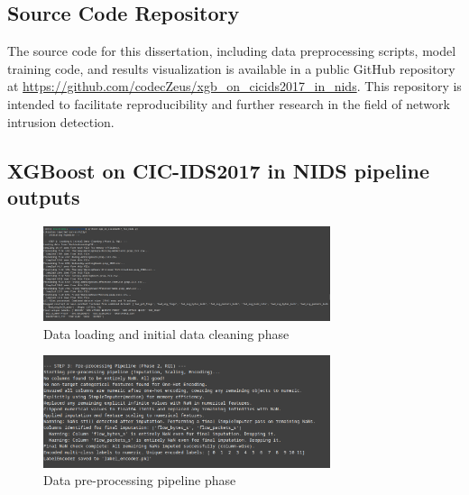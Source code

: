 \subsection{Source Code Repository}
The source code for this dissertation, including data preprocessing scripts, model training code, and results visualization
is available in a public GitHub repository at \url{https://github.com/codecZeus/xgb_on_cicids2017_in_nids}. This repository is intended to 
facilitate reproducibility and further research in the field of network intrusion detection.


\subsection*{XGBoost on CIC-IDS2017 in NIDS pipeline outputs}
\begin{figure}[H]
     \centering
     \includegraphics[width=0.75\textwidth]{assets/figures/outputs/1.png}
     \caption{Data loading and initial data cleaning phase}
     \label{fig:number_of_samples_per_category_initial_dataset} 
 \end{figure}

 \begin{figure}[H]
     \centering
     \includegraphics[width=0.75\textwidth]{assets/figures/outputs/2.png}
     \caption{Data pre-processing pipeline phase}
 \end{figure}
 
